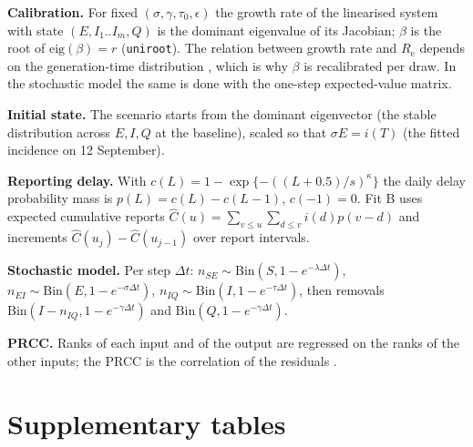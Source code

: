\documentclass[11pt,a4paper]{article}
\newcommand{\Rt}{R_{\mathrm{e}}}
\begin{document}
\textbf{Calibration.} For fixed $(\sigma,\gamma,\tau_0,\epsilon)$ the growth rate of the linearised system with state $(E,I_1..I_m,Q)$ is the dominant eigenvalue of its Jacobian; $\beta$ is the root of $\text{eig}(\beta)=r$ (\texttt{uniroot}). The relation between growth rate and $\Rt$ depends on the generation-time distribution \citep{wallinga2007}, which is why $\beta$ is recalibrated per draw. In the stochastic model the same is done with the one-step expected-value matrix.

\textbf{Initial state.} The scenario starts from the dominant eigenvector (the stable distribution across $E,I,Q$ at the baseline), scaled so that $\sigma E=i(T)$ (the fitted incidence on 12 September).

\textbf{Reporting delay.} With $c(L)=1-\exp\{-((L+0.5)/s)^\kappa\}$ the daily delay probability mass is $p(L)=c(L)-c(L-1)$, $c(-1)=0$. Fit B uses expected cumulative reports $\hat C(u)=\sum_{v\le u}\sum_{d\le v}i(d)p(v-d)$ and increments $\hat C(u_j)-\hat C(u_{j-1})$ over report intervals.

\textbf{Stochastic model.} Per step $\Delta t$: $n_{SE}\sim\text{Bin}(S,1-e^{-\lambda\Delta t})$, $n_{EI}\sim\text{Bin}(E,1-e^{-\sigma\Delta t})$, $n_{IQ}\sim\text{Bin}(I,1-e^{-\tau\Delta t})$, then removals $\text{Bin}(I-n_{IQ},1-e^{-\gamma\Delta t})$ and $\text{Bin}(Q,1-e^{-\gamma\Delta t})$.

\textbf{PRCC.} Ranks of each input and of the output are regressed on the ranks of the other inputs; the PRCC is the correlation of the residuals \citep{blower1994,marino2008}.

\section{Supplementary tables}
\begin{table}[H]\centering\small\caption{Partial rank correlation of 12-month cases with each parameter.}\label{tab:prcc}\end{table}
\begin{table}[H]\centering\small\caption{Fit B refitted at extreme natural-history values (change date fixed at the best estimate; $\epsilon=0.8$).}\label{tab:nh}\end{table}
\begin{table}[H]\centering\small\caption{Transmission rate and reproduction number by isolation effectiveness (refit at the best change date). The growth rates, which are what the data identify, do not depend on $\epsilon$.}\label{tab:byeff}\end{table}
\begin{table}[H]\centering\small\caption{Testing and positivity by month, 2026 (new confirmed cases after removing the 22 July step; samples analysed per day interpolated over missing days).}\label{tab:pos}\end{table}
\end{document}
